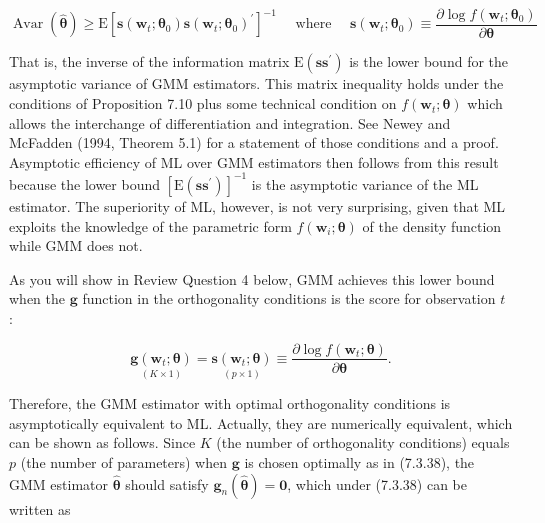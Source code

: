 \documentclass[10pt]{article}
\begin{document}
\begin{equation*}
\operatorname{Avar}(\hat{\boldsymbol{\theta}}) \geq \mathrm{E}\left[\mathbf{s}\left(\mathbf{w}_{t} ; \boldsymbol{\theta}_{0}\right) \mathbf{s}\left(\mathbf{w}_{t} ; \boldsymbol{\theta}_{0}\right)^{\prime}\right]^{-1} \quad \text { where } \quad \mathbf{s}\left(\mathbf{w}_{t} ; \boldsymbol{\theta}_{0}\right) \equiv \frac{\partial \log f\left(\mathbf{w}_{t} ; \boldsymbol{\theta}_{0}\right)}{\partial \boldsymbol{\theta}} \tag{7.3.37}
\end{equation*}


That is, the inverse of the information matrix $\mathrm{E}\left(\mathbf{s s}^{\prime}\right)$ is the lower bound for the asymptotic variance of GMM estimators. This matrix inequality holds under the conditions of Proposition 7.10 plus some technical condition on $f\left(\mathbf{w}_{t} ; \boldsymbol{\theta}\right)$ which allows the interchange of differentiation and integration. See Newey and McFadden (1994, Theorem 5.1) for a statement of those conditions and a proof. Asymptotic efficiency of ML over GMM estimators then follows from this result because the lower bound $\left[\mathrm{E}\left(\mathbf{s s}^{\prime}\right)\right]^{-1}$ is the asymptotic variance of the ML estimator. The superiority of ML, however, is not very surprising, given that ML exploits the knowledge of the parametric form $f\left(\mathbf{w}_{i} ; \boldsymbol{\theta}\right)$ of the density function while GMM does not.

As you will show in Review Question 4 below, GMM achieves this lower bound when the $\mathbf{g}$ function in the orthogonality conditions is the score for observation $t$ :


\begin{equation*}
\underset{(K \times 1)}{\mathbf{g}\left(\mathbf{w}_{t} ; \boldsymbol{\theta}\right)}=\underset{(p \times 1)}{\mathbf{s}\left(\mathbf{w}_{t} ; \boldsymbol{\theta}\right)} \equiv \frac{\partial \log f\left(\mathbf{w}_{t} ; \boldsymbol{\theta}\right)}{\partial \boldsymbol{\theta}} . \tag{7.3.38}
\end{equation*}


Therefore, the GMM estimator with optimal orthogonality conditions is asymptotically equivalent to ML. Actually, they are numerically equivalent, which can be shown as follows. Since $K$ (the number of orthogonality conditions) equals $p$ (the number of parameters) when $\mathbf{g}$ is chosen optimally as in (7.3.38), the GMM estimator $\hat{\boldsymbol{\theta}}$ should satisfy $\mathbf{g}_{n}(\hat{\boldsymbol{\theta}})=\mathbf{0}$, which under (7.3.38) can be written as
\end{document}

